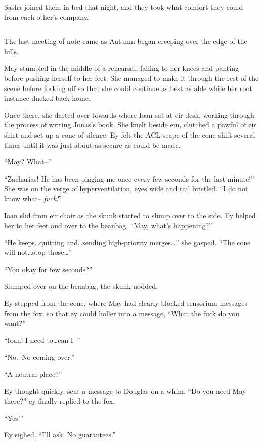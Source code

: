 Sasha joined them in bed that night, and they took what comfort they could from each other's company.

\begin{center}\rule{0.5\linewidth}{0.5pt}\end{center}

The last meeting of note came as Autumn began creeping over the edge of the hills.

May stumbled in the middle of a rehearsal, falling to her knees and panting before pushing herself to her feet. She managed to make it through the rest of the scene before forking off so that she could continue as best as able while her root instance ducked back home.

Once there, she darted over towards where Ioan sat at eir desk, working through the process of writing Jonas's book. She knelt beside em, clutched a pawful of eir shirt and set up a cone of silence. Ey felt the ACL-scape of the cone shift several times until it was just about as secure as could be made.

``May? What--''

``Zacharias! He has been pinging me once every few seconds for the last minute!'' She was on the verge of hyperventilation, eyes wide and tail bristled. ``I do not know what-- \emph{fuck!}''

Ioan slid from eir chair as the skunk started to slump over to the side. Ey helped her to her feet and over to the beanbag. ``May, what's happening?''

``He keeps\ldots quitting and\ldots sending high-priority merges\ldots{}'' she gasped. ``The cone will not\ldots stop those\ldots{}''

``You okay for few seconds?''

Slumped over on the beanbag, the skunk nodded.

Ey stepped from the cone, where May had clearly blocked sensorium messages from the fox, so that ey could holler into a message, ``What the fuck do you want?''

``Ioan! I need to\ldots can I--''

``No.~No coming over.''

``A neutral place?''

Ey thought quickly, sent a message to Douglas on a whim. ``Do you need May there?'' ey finally replied to the fox.

``Yes!''

Ey sighed. ``I'll ask. No guarantees.''

